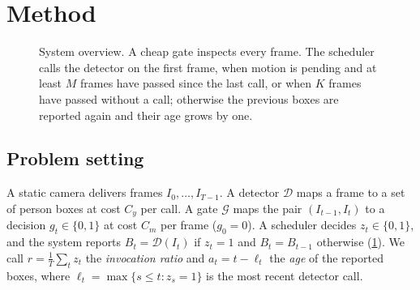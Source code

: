 \section{Method}\label{sec:method}

\begin{figure}[t]
\centering
{}
\caption{System overview. A cheap gate inspects every frame. The scheduler calls the detector on the first frame, when motion is pending and at least $M$ frames have passed since the last call, or when $K$ frames have passed without a call; otherwise the previous boxes are reported again and their age grows by one.}
\label{fig:system}
\end{figure}

\subsection{Problem setting}\label{sec:setting}
A static camera delivers frames $I_0,\dots,I_{T-1}$. A detector $\mathcal{D}$ maps a frame to a set of person boxes at cost $C_y$ per call. A gate $\mathcal{G}$ maps the pair $(I_{t-1},I_t)$ to a decision $g_t\in\{0,1\}$ at cost $C_m$ per frame ($g_0=0$). A scheduler decides $z_t\in\{0,1\}$, and the system reports $B_t=\mathcal{D}(I_t)$ if $z_t=1$ and $B_t=B_{t-1}$ otherwise (\cref{fig:system}). We call $r=\frac1T\sum_t z_t$ the \emph{invocation ratio} and $a_t=t-\ell_t$ the \emph{age} of the reported boxes, where $\ell_t=\max\{s\le t: z_s=1\}$ is the most recent detector call.

